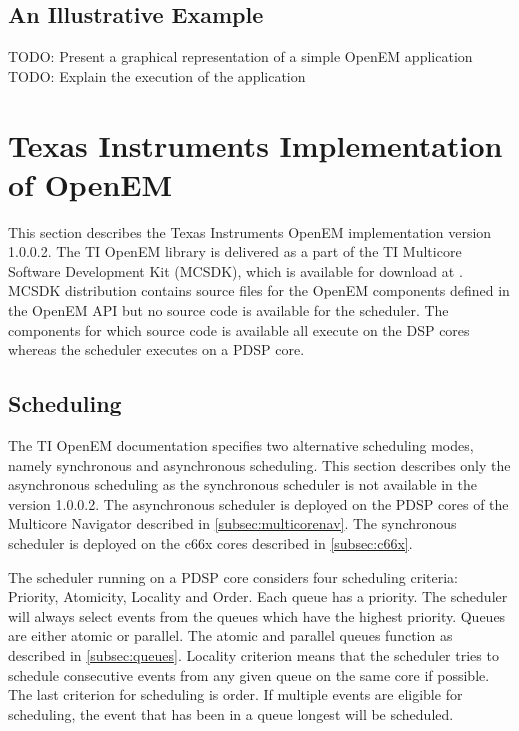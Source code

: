 \subsection{An Illustrative Example}
\label{subsec:example}
TODO: Present a graphical representation of a simple OpenEM application\\
TODO: Explain the execution of the application

\section[Texas Instruments Implementation of OpenEM]{Texas Instruments
Implementation \\ of OpenEM}
\label{sec:tiopenem}
This section describes the Texas Instruments OpenEM implementation version
1.0.0.2. The TI OpenEM library is delivered as a part of the TI Multicore
Software Development Kit (MCSDK), which is available for download at
\cite{mcsdkdown}. MCSDK distribution contains source files for the OpenEM
components defined in the OpenEM API but no source code is available for the
scheduler. The components for which source code is available all execute on the
DSP cores whereas the scheduler executes on a PDSP core.

\subsection{Scheduling}
The TI OpenEM documentation specifies two alternative scheduling modes, namely
synchronous and asynchronous scheduling. This section describes only the
asynchronous scheduling as the synchronous scheduler is not available in the
version 1.0.0.2. The asynchronous scheduler is deployed on the PDSP cores of the
Multicore Navigator described in \ref{subsec:multicorenav}. The synchronous
scheduler is deployed on the c66x cores described in \ref{subsec:c66x}.

The scheduler running on a PDSP core considers four scheduling criteria:
Priority, Atomicity, Locality and Order. Each queue has a priority. The
scheduler will always select events from the queues which have the highest
priority. Queues are either atomic or parallel. The atomic and parallel queues
function as described in \ref{subsec:queues}. Locality criterion means that the
scheduler tries to schedule consecutive events from any given queue on the same
core if possible. The last criterion for scheduling is order. If multiple events
are eligible for scheduling, the event that has been in a queue longest will be
scheduled. \cite{openemwhite}

